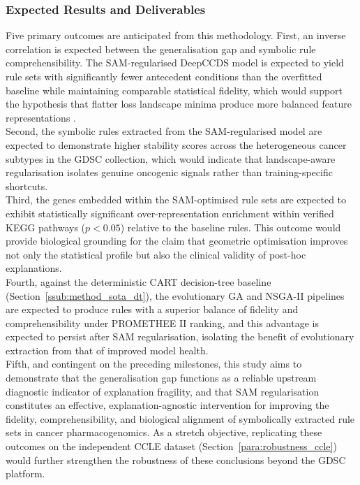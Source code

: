 \subsubsection{Expected Results and Deliverables}
\label{ssub:method_expected_results}
Five primary outcomes are anticipated from this methodology. First, an inverse correlation is
expected between the generalisation gap and symbolic rule comprehensibility. The SAM-regularised
DeepCCDS model is expected to yield rule sets with significantly fewer antecedent conditions than the
overfitted baseline while maintaining comparable statistical fidelity, which would support the
hypothesis that flatter loss landscape minima produce more balanced feature representations
\cite{Springer2024}.
\\
Second, the symbolic rules extracted from the SAM-regularised model are expected to demonstrate higher
stability scores across the heterogeneous cancer subtypes in the GDSC collection, which would indicate
that landscape-aware regularisation isolates genuine oncogenic signals rather than training-specific
shortcuts.
\\
Third, the genes embedded within the SAM-optimised rule sets are expected to exhibit statistically
significant over-representation enrichment within verified KEGG pathways ($p < 0.05$) relative to the
baseline rules. This outcome would provide biological grounding for the claim that geometric
optimisation improves not only the statistical profile but also the clinical validity of post-hoc
explanations.
\\
Fourth, against the deterministic CART decision-tree baseline (Section~\ref{ssub:method_sota_dt}), the
evolutionary GA and NSGA-II pipelines are expected to produce rules with a superior balance of
fidelity and comprehensibility under PROMETHEE II ranking, and this advantage is expected to persist
after SAM regularisation, isolating the benefit of evolutionary extraction from that of improved model
health.
\\
Fifth, and contingent on the preceding milestones, this study aims to demonstrate that the
generalisation gap functions as a reliable upstream diagnostic indicator of explanation fragility, and
that SAM regularisation constitutes an effective, explanation-agnostic intervention for improving the
fidelity, comprehensibility, and biological alignment of symbolically extracted rule sets in cancer
pharmacogenomics. As a stretch objective, replicating these outcomes on the independent CCLE dataset
(Section~\ref{para:robustness_ccle}) would further strengthen the robustness of these conclusions
beyond the GDSC platform.
